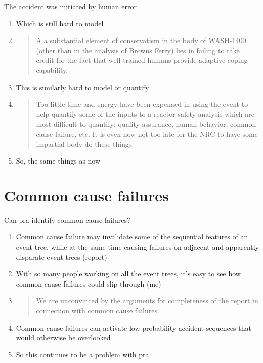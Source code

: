 \documentclass[aspectratio=1610,pdftex,dvipsnames,compress,xcolor={dvipsnames}]{beamer}
\newcommand{\acs}{\acrshort} %
\begin{document}
\begin{frame}{The accident was initiated by human error}
    \begin{enumerate}[series=outerlist,topsep=0pt,itemsep=15pt,leftmargin=*,label=(\arabic*)]
        \item[]Which is still hard to model
        \item[]
            \begin{quote}
                A a substantial element of conservatism in the body of WASH-1400 (other than in the analysis of Browns Ferry) lies in failing to take credit for the fact that well-trained humans provide adaptive coping capability.
            \end{quote}
        \item[]This is similarly hard to model or quantify
        \item[]
            \begin{quote}
                Too little time and energy have been expenaed in using the event to help quantify some of the inputs to a reactor safety analysis which are most difficult to quantify: quality assurance, human behavior, common cause failure, etc. It is even now not too late for the NRC to have some impartial body do these things.
            \end{quote}
        \item[]So, the same things as now 
    \end{enumerate}
\end{frame}


\section{Common cause failures}


\addtocounter{framenumber}{-1}
\begin{frame}{Can \acs{pra} identify common cause failures?}
    \begin{enumerate}[series=outerlist,topsep=0pt,itemsep=21pt,leftmargin=*,label=(\arabic*)]
        \item[]Common cause failure may invalidate some of the sequential features of an event-tree, while at the same time causing failures on adjacent and apparently disparate event-trees (report)
        \item[]With so many people working on all the event trees, it's easy to see how common cause failures could slip through (me) 
        \item[]
            \begin{quote}
                We are unconvinced by the arguments for completeness of the report in connection with common cause failures.
            \end{quote}
        \item[]Common cause failures can activate low probability accident sequences that would otherwise be overlooked
        \item[]So this continues to be a problem with \acs{pra}
    \end{enumerate}
\end{frame}
\end{document}
